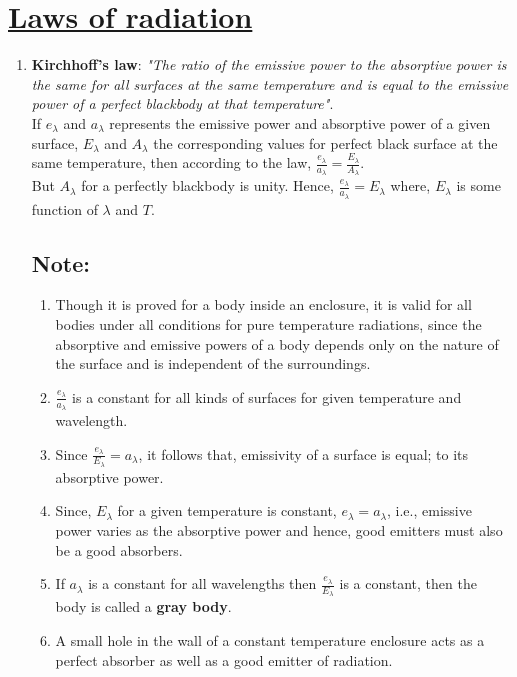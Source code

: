 \documentclass[14pt,a4paper]{article}
\begin{document}
\section{\underline{Laws of radiation}}
\begin{enumerate}
	\item \textbf{Kirchhoff's law}: \textit{"The ratio of the emissive power to the absorptive power is the same for all surfaces at the same temperature and is equal to the emissive power of a perfect blackbody at that temperature"}.\\
	If $e_{\lambda}$ and $a_{\lambda}$ represents the emissive power and absorptive power of a given surface, $E_{\lambda}$ and $A_{\lambda}$ the corresponding values for perfect black surface at the same temperature,
	then according to the law,
	$\frac{e_{\lambda}}{a_{\lambda}} = \frac{E_{\lambda}}{A_{\lambda}}$.
	\\
	But $A_{\lambda}$ for a perfectly blackbody is unity. Hence, $\frac{e_{\lambda}}{a_{\lambda}} = E_{\lambda} $ where, $E_{\lambda}$ is some function of $\lambda$ and $T$.

\subsection{\textbf{Note}:}
\begin{enumerate}
	\item Though it is proved for a body inside an enclosure, it is valid for all bodies under all conditions for pure temperature radiations, since the absorptive and emissive powers of a body depends only on the nature of the surface and is independent of the surroundings.
	\item $\frac{e_{\lambda}}{a_{\lambda}}$ is a constant for all kinds of surfaces for given temperature and wavelength.
	\item Since $\frac{e_{\lambda}}{E_{\lambda}} = a_{\lambda}$, it follows that, emissivity of a surface is equal; to its absorptive power.
	\item Since, $E_{\lambda}$ for a given temperature is constant, $e_{\lambda}=a_{\lambda}$, i.e., emissive power varies as the absorptive power and hence, good emitters must also be a good absorbers.
	\item If $a_{\lambda}$ is a constant for all wavelengths then  $\frac{e_{\lambda}}{E_{\lambda}}$ is a constant, then the body is called a \textbf{gray body}.
	\item A small hole in the wall of a constant temperature enclosure acts as a perfect absorber as well as a good emitter of radiation.
\end{enumerate}


\end{enumerate}
\end{document}

